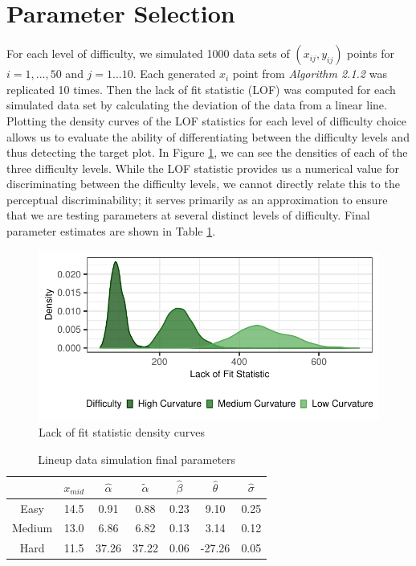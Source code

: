 \documentclass[print]{nuthesis}
\begin{document}
\hypertarget{parameter-selection}{%
\section{Parameter Selection}\label{parameter-selection}}

For each level of difficulty, we simulated 1000 data sets of \((x_{ij}, y_{ij})\) points for \(i = 1,...,50\) and \(j = 1...10\).
Each generated \(x_i\) point from \textit{Algorithm 2.1.2} was replicated 10 times.
Then the lack of fit statistic (LOF) was computed for each simulated data set by calculating the deviation of the data from a linear line.
Plotting the density curves of the LOF statistics for each level of difficulty choice allows us to evaluate the ability of differentiating between the difficulty levels and thus detecting the target plot.
In Figure \ref{fig:lof-density-curves}, we can see the densities of each of the three difficulty levels.
While the LOF statistic provides us a numerical value for discriminating between the difficulty levels, we cannot directly relate this to the perceptual discriminability; it serves primarily as an approximation to ensure that we are testing parameters at several distinct levels of difficulty.
Final parameter estimates are shown in Table \ref{tab:parameter-data}.

\begin{figure}

{\centering \includegraphics[width=\linewidth]{thesis_files/figure-latex/lof-density-curves-1} 

}

\caption{Lack of fit statistic density curves}\label{fig:lof-density-curves}
\end{figure}

\begin{table}

\caption{\label{tab:parameter-data}Lineup data simulation final parameters}
\centering
\begin{tabular}[t]{ccccccc}
\toprule
 & $x_{mid}$ & $\hat\alpha$ & $\tilde\alpha$ & $\hat\beta$ & $\hat\theta$ & $\hat\sigma$\\
\midrule
Easy & 14.5 & 0.91 & 0.88 & 0.23 & 9.10 & 0.25\\
Medium & 13.0 & 6.86 & 6.82 & 0.13 & 3.14 & 0.12\\
Hard & 11.5 & 37.26 & 37.22 & 0.06 & -27.26 & 0.05\\
\bottomrule
\end{tabular}
\end{table}
\end{document}

